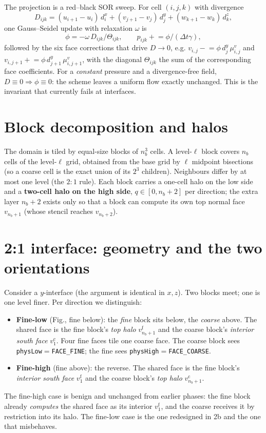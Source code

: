 \documentclass[11pt]{article}
\newcommand{\fine}{\mathrm{f}}
\newcommand{\coarse}{\mathrm{c}}
\begin{document}
The projection is a red--black SOR sweep. For cell $(i,j,k)$ with
divergence
\begin{equation}
  D_{ijk}=(u_{i+1}-u_i)\,d^x_i+(v_{j+1}-v_j)\,d^y_j+(w_{k+1}-w_k)\,d^z_k,
  \label{eq:div}
\end{equation}
one Gauss--Seidel update with relaxation $\omega$ is
\begin{equation}
  \phi=-\omega\,D_{ijk}/\Theta_{ijk},\qquad
  p_{ijk}\mathrel{+}=\phi/(\Delta t\gamma),
\end{equation}
followed by the six face corrections that drive $D\to 0$, e.g.
$v_{i,j}\mathrel{-}=\phi\,d^y_j\,\mu^v_{i,j}$ and
$v_{i,j+1}\mathrel{+}=\phi\,d^y_{j+1}\,\mu^v_{i,j+1}$, with the diagonal
$\Theta_{ijk}$ the sum of the corresponding face coefficients. For a
\emph{constant} pressure and a divergence-free field, $D\equiv0\Rightarrow
\phi\equiv0$: the scheme leaves a uniform flow exactly unchanged. This is the
invariant that currently fails at interfaces.

\section{Block decomposition and halos}

The domain is tiled by equal-size blocks of $n_b^3$ cells. A level-$\ell$
block covers $n_b$ cells of the level-$\ell$ grid, obtained from the base
grid by $\ell$ midpoint bisections (so a coarse cell is the exact union of
its $2^3$ children). Neighbours differ by at most one level (the $2{:}1$
rule). Each block carries a one-cell halo on the low side and a
\textbf{two-cell halo on the high side}, $q\in[0,n_b{+}2]$ per direction; the
extra layer $n_b{+}2$ exists only so that a block can compute its own top
normal face $v_{n_b+1}$ (whose stencil reaches $v_{n_b+2}$).

\section{2:1 interface: geometry and the two orientations}

Consider a $y$-interface (the argument is identical in $x,z$). Two blocks
meet; one is one level finer. Per direction we distinguish:
\begin{itemize}
\item \textbf{Fine-low} (Fig., fine below): the \emph{fine} block sits below,
  the \emph{coarse} above. The shared face is the fine block's
  \emph{top halo} $v^\fine_{n_b+1}$ and the coarse block's \emph{interior
  south face} $v^\coarse_{1}$. Four fine faces tile one coarse face.
  The coarse block sees \texttt{physLow}$=$\texttt{FACE\_FINE}; the fine sees
  \texttt{physHigh}$=$\texttt{FACE\_COARSE}.
\item \textbf{Fine-high} (fine above): the reverse. The shared face is the
  fine block's \emph{interior south face} $v^\fine_{1}$ and the coarse
  block's \emph{top halo} $v^\coarse_{n_b+1}$.
\end{itemize}
The fine-high case is benign and unchanged from earlier phases: the fine
block already \emph{computes} the shared face as its interior $v^\fine_1$,
and the coarse receives it by restriction into its halo. The fine-low case
is the one redesigned in 2b and the one that misbehaves.
\end{document}
